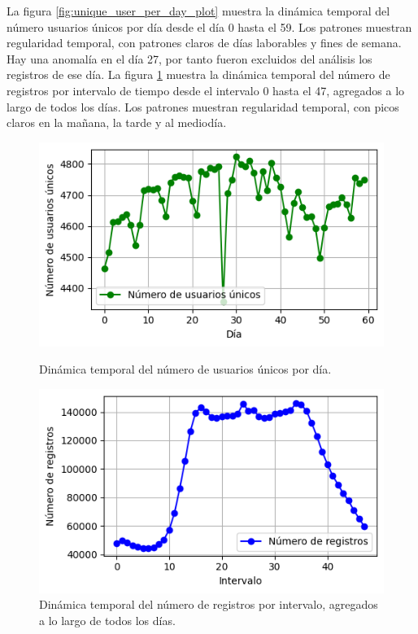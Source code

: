 La figura \ref{fig:unique_user_per_day_plot} muestra la dinámica temporal del número usuarios únicos por día desde el día 0 hasta el 59. Los patrones muestran regularidad temporal, con patrones claros de días laborables y fines de semana. Hay una anomalía en el día 27, por tanto fueron excluidos del análisis los registros de ese día. La figura \ref{fig:ping_per_timeslot_plot} muestra la dinámica temporal del número de registros por intervalo de tiempo desde el intervalo 0 hasta el 47, agregados a lo largo de todos los días. Los patrones muestran regularidad temporal, con picos claros en la mañana, la tarde y al mediodía.

\begin{figure}[!htb]
\centering
\begin{minipage}{0.45\textwidth}
    \centering
    \includegraphics[width=\textwidth]{Graphics/unique_user_per_day_plot.png}
    \caption{Dinámica temporal del número de usuarios únicos por día.}
    \label{fig:unique_user_per_day_plot}
\end{minipage}%
\hfill
\begin{minipage}{0.45\textwidth}
    \centering
    \includegraphics[width=\textwidth]{Graphics/ping_per_timeslot_plot.png}
    \caption{Dinámica temporal del número de registros por intervalo, agregados a lo largo de todos los días.}
    \label{fig:ping_per_timeslot_plot}
\end{minipage}%
\end{figure}

